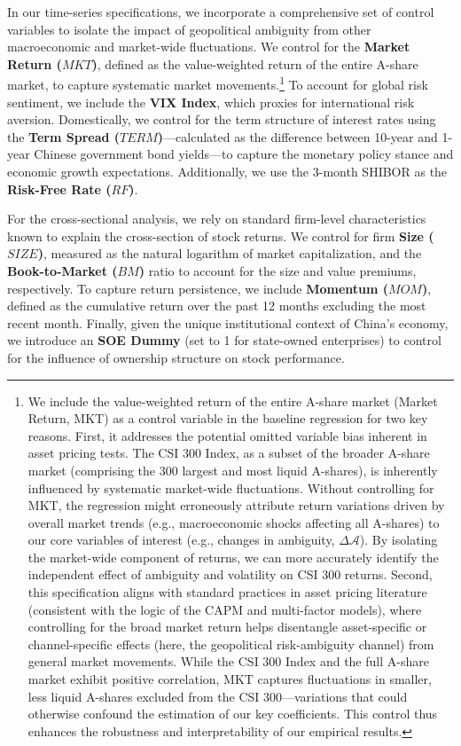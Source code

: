 \documentclass[preprint,12pt,authoryear]{elsarticle}
\begin{document}
In our time-series specifications, we incorporate a comprehensive set of control variables to isolate the impact of geopolitical ambiguity from other macroeconomic and market-wide fluctuations. We control for the \textbf{Market Return ($MKT$)}, defined as the value-weighted return of the entire A-share market, to capture systematic market movements.\footnote{We include the value-weighted return of the entire A-share market (Market Return, MKT) as a control variable in the baseline regression for two key reasons. First, it addresses the potential omitted variable bias inherent in asset pricing tests. The CSI 300 Index, as a subset of the broader A-share market (comprising the 300 largest and most liquid A-shares), is inherently influenced by systematic market-wide fluctuations. Without controlling for MKT, the regression might erroneously attribute return variations driven by overall market trends (e.g., macroeconomic shocks affecting all A-shares) to our core variables of interest (e.g., changes in ambiguity, $\Delta\mathcal{A}$). By isolating the market-wide component of returns, we can more accurately identify the independent effect of ambiguity and volatility on CSI 300 returns. Second, this specification aligns with standard practices in asset pricing literature (consistent with the logic of the CAPM and multi-factor models), where controlling for the broad market return helps disentangle asset-specific or channel-specific effects (here, the geopolitical risk-ambiguity channel) from general market movements. While the CSI 300 Index and the full A-share market exhibit positive correlation, MKT captures fluctuations in smaller, less liquid A-shares excluded from the CSI 300—variations that could otherwise confound the estimation of our key coefficients. This control thus enhances the robustness and interpretability of our empirical results.} To account for global risk sentiment, we include the \textbf{VIX Index}, which proxies for international risk aversion. Domestically, we control for the term structure of interest rates using the \textbf{Term Spread ($TERM$)}—calculated as the difference between 10-year and 1-year Chinese government bond yields—to capture the monetary policy stance and economic growth expectations. Additionally, we use the 3-month SHIBOR as the \textbf{Risk-Free Rate ($RF$)}.

For the cross-sectional analysis, we rely on standard firm-level characteristics known to explain the cross-section of stock returns. We control for firm \textbf{Size ($SIZE$)}, measured as the natural logarithm of market capitalization, and the \textbf{Book-to-Market ($BM$)} ratio to account for the size and value premiums, respectively. To capture return persistence, we include \textbf{Momentum ($MOM$)}, defined as the cumulative return over the past 12 months excluding the most recent month. Finally, given the unique institutional context of China's economy, we introduce an \textbf{SOE Dummy} (set to 1 for state-owned enterprises) to control for the influence of ownership structure on stock performance.
\end{document}
